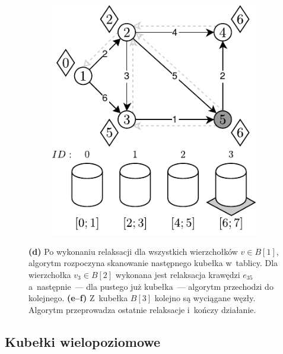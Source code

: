 \begin{figure}[!htbp]
\begin{subfigure}[b]{0.3\textwidth}
		\caption{}
	\end{subfigure}
	\begin{subfigure}[b]{0.3\textwidth}
		\includegraphics[width=\textwidth]{Chapter_II/APROXIMATE-BUCKETS-Example/f.pdf}
		\caption{}
	\end{subfigure}
	\caption{ \textbf{(d)} Po wykonaniu relaksacji dla wszystkich wierzchołków $v \in B \left[ 1 \right]$, algorytm rozpoczyna skanowanie następnego kubełka w~tablicy. Dla wierzchołka $v_{3} \in B \left[ 2 \right]$ wykonana jest relaksacja krawędzi $e_{35}$ a~następnie~--- dla pustego już kubełka~--- algorytm przechodzi do kolejnego. \textbf{(e--f)} Z~kubełka $ B \left[ 3 \right]$ kolejno są wyciągane węzły. Algorytm przeprowadza ostatnie relaksacje i~kończy działanie.} \label{fig:exampleAproximateBuckets2}
\end{figure}

\subsection{Kubełki wielopoziomowe}

